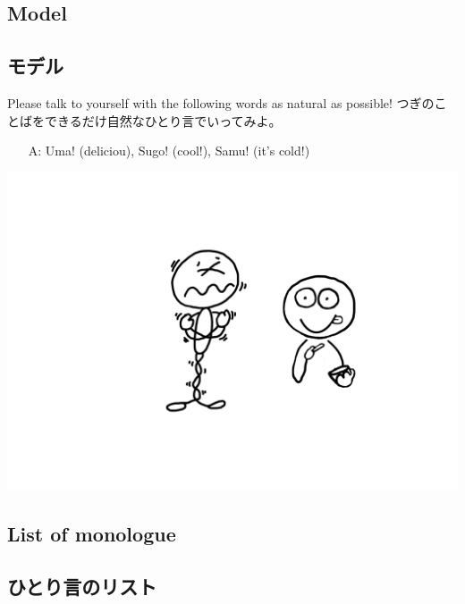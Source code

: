 \documentclass[uplatex,dvipdfmx,b5paper,english,10pt]{jsbook}
\begin{document}
\ifEnglish
\subsection{Model}
\else
\subsection{モデル}
\fi

\begin{toiquestion}
\ifEnglish
Please talk to yourself with the following words as natural as possible!
\else
つぎのことばをできるだけ自然なひとり言でいってみよ。
\fi
\end{toiquestion}

\begin{itemize}
 \item[A:] Uma! (deliciou), Sugo! (cool!),  Samu! (it's cold!)
\end{itemize}

\vspace*{-2\baselineskip}
\begin{flushright}
\includegraphics[trim=270 150 180 140, clip, width=.2\hsize]{img/uma.png}
\end{flushright}
\vspace*{-4\baselineskip}

\ifEnglish
\subsection{List of monologue}
\else
\subsection{ひとり言のリスト}
\fi
\end{document}
